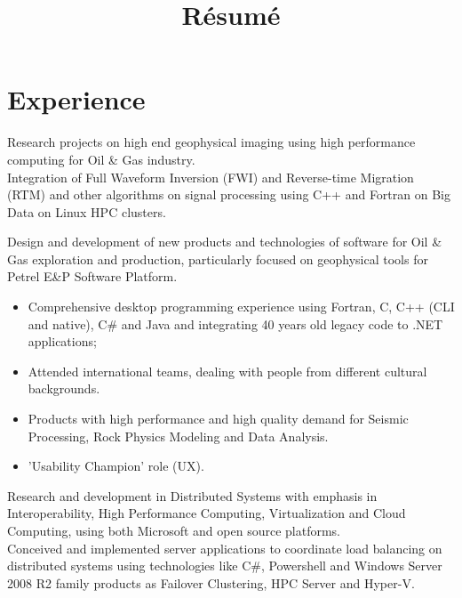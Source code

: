 \documentclass[11pt, a4paper, sans]{moderncv} %
\title{R\'esum\'e}
\begin{document}
\makecvtitle %












\section{Experience}


{
Research projects on high end geophysical imaging using high performance computing for Oil \& Gas industry.\\
Integration of Full Waveform Inversion (FWI) and Reverse-time Migration (RTM) and other algorithms on signal processing using C++ and Fortran on Big Data on Linux HPC clusters.
}




{
Design and development of new products and technologies of software for Oil \& Gas exploration and production, particularly focused on geophysical tools for Petrel E\&P Software Platform. 
\begin{itemize}
\item Comprehensive desktop programming experience using Fortran, C, C++ (CLI and native), C\# and Java and integrating 40 years old legacy code to .NET applications;
\item Attended international teams, dealing with people from different cultural backgrounds.
\item Products with high performance and high quality demand for Seismic Processing, Rock Physics Modeling and Data Analysis.
\item 'Usability Champion' role (UX).
\end{itemize}
}





{
Research and development in Distributed Systems with emphasis in Interoperability, High Performance Computing, Virtualization and Cloud Computing, using both Microsoft and open source platforms.\\
Conceived and implemented server applications to coordinate load balancing on distributed systems using technologies like C\#, Powershell and Windows Server 2008 R2 family products as Failover Clustering, HPC Server and Hyper-V.
}
\end{document}
